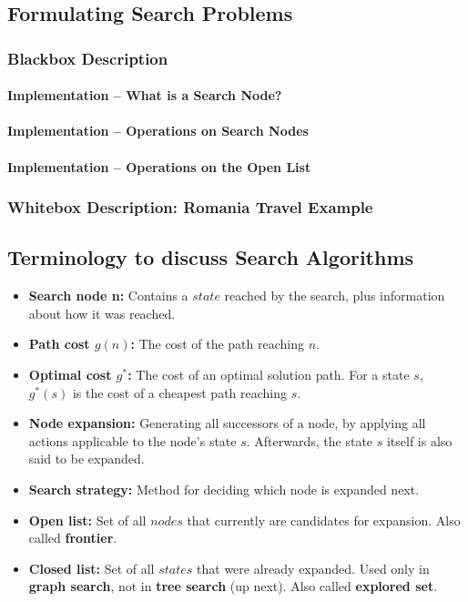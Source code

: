 \documentclass[conference, a4paper]{styles/acmsiggraph}
\newcommand\subsubsubsection{\paragraph}
\begin{document}
    \subsection{Formulating Search Problems}
        \subsubsection{Blackbox Description}
            \subsubsubsection{Implementation – What is a Search Node?}
            \subsubsubsection{Implementation – Operations on Search Nodes}
            \subsubsubsection{Implementation – Operations on the Open List}
        \subsubsection{Whitebox Description: Romania Travel Example}
        
        
        
        
        
        

    \subsection{Terminology to discuss Search Algorithms}
        \begin{itemize}
            \item \textbf{Search node n:}\newline
                Contains a $state$ reached by the search, plus information about how it was reached.
            \item \textbf{Path cost $g(n)$:}\newline
                The cost of the path reaching $n$.
            \item \textbf{Optimal cost $g^*$:}\newline
                The cost of an optimal solution path.
                For a state $s$, $g^*(s)$ is the cost of a cheapest path reaching $s$.
            \item \textbf{Node expansion:}\newline
                Generating all successors of a node, by applying all actions applicable to the node's state $s$.
                Afterwards, the state $s$ itself is also said to be expanded.
            \item \textbf{Search strategy:}\newline
                Method for deciding which node is expanded next.
            \item \textbf{Open list:}\newline
                Set of all $nodes$ that currently are candidates for expansion.
                Also called \textbf{frontier}.
            \item \textbf{Closed list:}\newline
                Set of all $states$ that were already expanded.
                Used only in \textbf{graph search}, not in \textbf{tree search} (up next).
                Also called \textbf{explored set}.
        \end{itemize}
    
\end{document}
